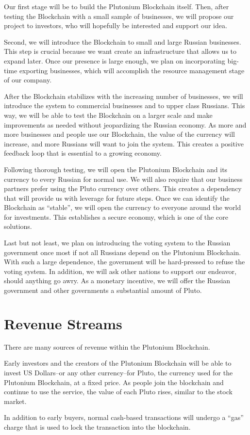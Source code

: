 \documentclass[12pt]{article}
\begin{document}
Our first stage will be to build the Plutonium Blockchain itself. Then, after testing the Blockchain with a small sample of businesses, we will propose our project to investors, who will hopefully be interested and support our idea.

Second, we will introduce the Blockchain to small and large Russian businesses. This step is crucial because we want create an infrastructure that allows us to expand later. Once our presence is large enough, we plan on incorporating big-time exporting businesses, which will accomplish the resource management stage of our company.

After the Blockchain stabilizes with the increasing number of businesses, we will introduce the system to commercial businesses and to upper class Russians. This way, we will be able to test the Blockchain on a larger scale and make improvements as needed without jeopardizing the Russian economy. As more and more businesses and people use our Blockchain, the value of the currency will increase, and more Russians will want to join the system. This creates a positive feedback loop that is essential to a growing economy. 

Following thorough testing, we will open the Plutonium Blockchain and its currency to every Russian for normal use. We will also require that our business partners prefer using the Pluto currency over others. This creates a dependency that will provide us with leverage for future steps. Once we can identify the Blockchain as ``stable'', we will open the currency to everyone around the world for investments. This establishes a secure economy, which is one of the core solutions.

Last but not least, we plan on introducing the voting system to the Russian government once most if not all Russians depend on the Plutonium Blockchain. With such a large dependence, the government will be hard-pressed to refuse the voting system. In addition, we will ask other nations to support our endeavor, should anything go awry. As a monetary incentive, we will offer the Russian government and other governments a substantial amount of Pluto.
\pagebreak
\section{Revenue Streams}
There are many sources of revenue within the Plutonium Blockchain.

Early investors and the creators of the Plutonium Blockchain will be able to invest US Dollars--or any other currency--for Pluto, the currency used for the Plutonium Blockchain, at a fixed price. As people join the blockchain and continue to use the service, the value of each Pluto rises, similar to the stock market.

In addition to early buyers, normal cash-based transactions will undergo a ``gas'' charge that is used to lock the transaction into the blockchain. 
\end{document}

